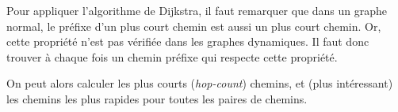 \documentclass[11pt,a4paper]{article}
\begin{document}
Pour appliquer l'algorithme de Dijkstra, il faut remarquer que dans un
graphe normal, le préfixe d'un plus court chemin est aussi un plus
court chemin. Or, cette propriété n'est pas vérifiée dans les graphes
dynamiques. Il faut donc trouver à chaque fois un chemin préfixe qui
respecte cette propriété.

On peut alors calculer les plus courts (\textit{hop-count}) chemins,
et (plus intéressant) les chemins les plus rapides pour toutes les
paires de chemins.



\end{document}
